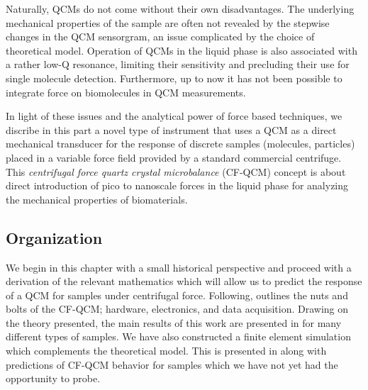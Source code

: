 Naturally, QCMs do not come without their own disadvantages. The underlying
mechanical properties of the sample are often not revealed by the stepwise
changes in the QCM sensorgram, an issue complicated by the choice of
theoretical model.  Operation of QCMs in the liquid phase is also
associated with a rather low-Q resonance, limiting their sensitivity and
precluding their use for single molecule detection.  Furthermore, up to now
it has not been possible to integrate force on biomolecules in QCM
measurements.

In light of these issues and the analytical power of force based
techniques, we discribe in this part a novel type of instrument that uses a
QCM as a direct mechanical transducer for the response of discrete samples
(molecules, particles) placed in a variable force field provided by a
standard commercial centrifuge.  This \textit{centrifugal force quartz
crystal microbalance} (CF-QCM) concept is about direct introduction of pico
to nanoscale forces in the liquid phase for analyzing the mechanical
properties of biomaterials.

\subsection{Organization}
We begin in this chapter with a small historical perspective and proceed
with a derivation of the relevant mathematics which will allow us to
predict the response of a QCM for samples under centrifugal force.
Following,  outlines the nuts and bolts of the
CF-QCM; hardware, electronics, and data acquisition.  Drawing on the theory
presented, the main results of this work are presented in
 for many different types of samples.  We have
also constructed a finite element simulation which complements the
theoretical model.  This is presented in  along
with predictions of CF-QCM behavior for samples which we have not yet had
the opportunity to probe.
